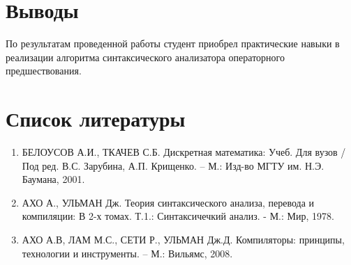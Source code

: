 
	\newpage
	\section{Выводы}
	
	По результатам проведенной работы студент приобрел практические навыки в реализации алгоритма синтаксического анализатора
		операторного предшествования.


	\section{Список литературы}
		\begin{enumerate}
			\item БЕЛОУСОВ А.И., ТКАЧЕВ С.Б. Дискретная математика: Учеб. Для вузов / Под ред. В.С. Зарубина, А.П. Крищенко. – М.: Изд-во МГТУ им. Н.Э. Баумана, 2001.
			\item АХО А., УЛЬМАН Дж. Теория синтаксического анализа, перевода и компиляции: В 2-х томах. Т.1.: Синтаксичечкий анализ. - М.: Мир, 1978.
			\item АХО А.В, ЛАМ М.С., СЕТИ Р., УЛЬМАН Дж.Д. Компиляторы: принципы, технологии и инструменты. – М.: Вильямс, 2008.
		\end{enumerate}
	